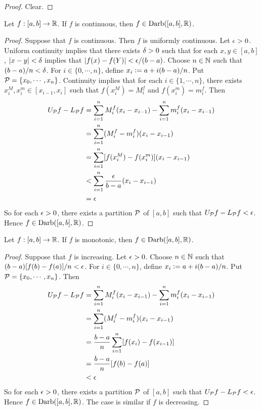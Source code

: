 \documentclass{book}
\begin{document}
	\begin{proof}
		Clear.
	\end{proof}
	
	\begin{ex}  
		Let $f:[a,b] \rightarrow \mathbb{R}$. If $f$ is continuous, then $f \in \text{Darb}([a,b], \mathbb{R})$. 
	\end{ex}
	
	\begin{proof}
		Suppose that $f$ is continuous. Then $f$ is uniformly continuous. Let $\epsilon >0$. Uniform continuity implies that there exists $\delta > 0$ such that for each $x, y \in [a,b]$, $|x-y| < \delta$ implies that $|f(x) - f(Y)| < \epsilon/(b-a)$. Choose $n \in \mathbb{N}$ such that $(b-a)/n < \delta$. For $i \in \{0, \cdots, n\}$, define $x_i \vcentcolon= a + i(b-a)/n$. Put $\mathcal{P} = \{x_0, \cdots, x_n\}$. Continuity implies that for each $i \in \{1, \cdots, n\}$, there exists $x_i^M, x_i^m \in [x_{i-1}, x_i]$ such that $f(x_i^M) = M_i^f$ and $f(x_i^m) = m_i^f$. Then 
		\begin{align*}
			U_{\mathcal{P}} f - L_{\mathcal{P}} f 
			&= \sum\limits_{i=1}^n M^f_i(x_i - x_{i-1}) - \sum\limits_{i=1}^n m^f_i(x_i - x_{i-1}) \\
			&= \sum\limits_{i=1}^n (M^f_i - m^f_i)(x_i - x_{i-1}) \\
			&= \sum\limits_{i=1}^n [f(x_i^M) - f(x_i^m)](x_i - x_{i-1}) \\
			& < \sum\limits_{i=1}^n \frac{\epsilon}{b-a}(x_i - x_{i-1}) \\
			&= \epsilon 
		\end{align*}
		So for each $\epsilon >0$, there exists a partition $\mathcal{P}$ of $[a,b]$ such that $U_{\mathcal{P}} f - L_{\mathcal{P}} f < \epsilon$. Hence $f \in \text{Darb}([a,b], \mathbb{R})$.
	\end{proof}
	
	\begin{ex}  
		Let $f:[a,b] \rightarrow \mathbb{R}$. If $f$ is monotonic, then $f \in \text{Darb}([a,b], \mathbb{R})$.
	\end{ex}
	
	\begin{proof}
		Suppose that $f$ is increasing. Let $\epsilon >0$. Choose $n \in \mathbb{N}$ such that $(b-a)[f(b) - f(a)] /n < \epsilon $. For $i \in \{0, \cdots, n\}$, define $x_i \vcentcolon= a + i(b-a)/n$. Put $\mathcal{P} = \{x_0, \cdots, x_n\}$. Then 
		\begin{align*}
			U_{\mathcal{P}} f - L_{\mathcal{P}} f 
			&= \sum\limits_{i=1}^n M^f_i(x_i - x_{i-1}) - \sum\limits_{i=1}^n m^f_i(x_i - x_{i-1}) \\
			&= \sum\limits_{i=1}^n (M^f_i - m^f_i)(x_i - x_{i-1}) \\
			&= \frac{b-a}{n} \sum\limits_{i=1}^n [f(x_i) - f(x_{i-1})]  \\
			&= \frac{b-a}{n} [f(b) - f(a)] \\
			& < \epsilon
		\end{align*}
		So for each $\epsilon >0$, there exists a partition $\mathcal{P}$ of $[a,b]$ such that $U_{\mathcal{P}} f - L_{\mathcal{P}} f < \epsilon$. Hence $f \in \text{Darb}([a,b], \mathbb{R})$. The case is similar if $f$ is decreasing. 
	\end{proof}
	
\end{document}
